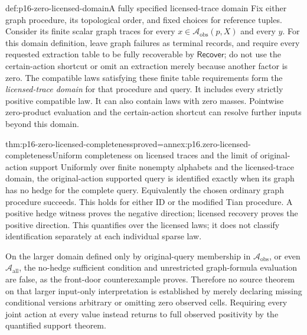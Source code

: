 \begin{hbdefinition}{def:p16-zero-licensed-domain}{A fully specified licensed-trace domain}
Fix either graph procedure, its topological order, and fixed choices
for reference tuples. Consider its finite scalar graph traces for
every \(x\in\mathcal A_{\mathrm{obs}}(p,X)\) and every \(y\).
For this domain definition, leave graph failures as terminal records,
and require every requested extraction table to be fully recoverable
by \(\mathsf{Recover}\); do not use the certain-action shortcut
or omit an extraction merely because another factor is zero.
The compatible laws satisfying these finite table requirements form
the \emph{licensed-trace domain} for that procedure and query.
It includes every strictly positive compatible law. It can also contain
laws with zero masses. Pointwise zero-product evaluation and the
certain-action shortcut can resolve further inputs beyond this domain.
\end{hbdefinition}

\begin{hbtheorem}{thm:p16-zero-licensed-completeness}{proved=annex:p16.zero-licensed-completeness}{Uniform completeness on licensed traces and the limit of original-action support}
Uniformly over finite nonempty alphabets and the licensed-trace domain,
the original-action supported query is identified exactly when its graph
has no hedge for the complete query. Equivalently the chosen ordinary
graph procedure succeeds. This holds for either ID or the modified Tian
procedure. A positive hedge witness proves the negative direction;
licensed recovery proves the positive direction.
This quantifies over the licensed laws; it does not classify
identification separately at each individual sparse law.

On the larger domain defined only by original-query membership in
\(\mathcal A_{\mathrm{obs}}\), or even \(\mathcal A_{\mathrm{all}}\),
the no-hedge sufficient condition and unrestricted graph-formula evaluation
are false, as the front-door counterexample proves. Therefore no
source theorem on that larger input-only interpretation is established
by merely declaring missing conditional versions arbitrary or omitting
zero observed cells. Requiring every joint action at every value instead
returns to full observed positivity by the quantified support theorem.
\end{hbtheorem}

